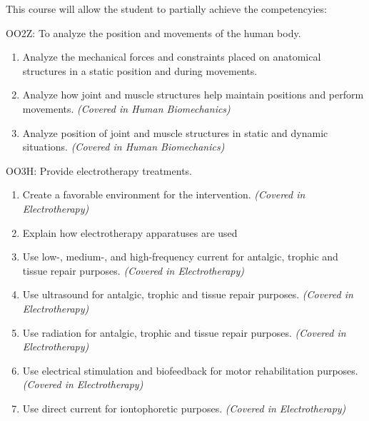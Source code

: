 {This course will allow the student to partially achieve the competencyies:

OO2Z:  To analyze the position and movements of the human body.
\begin{enumerate}
\item Analyze the mechanical forces and constraints placed on anatomical structures in a static position and during movements.
\item Analyze how joint and muscle structures help maintain positions and perform movements.  {\itshape (Covered in Human Biomechanics)}
\item Analyze position of joint and muscle structures in static and dynamic situations.  {\itshape (Covered in Human Biomechanics)}
\end{enumerate}
\smallskip

OO3H:	Provide electrotherapy treatments.
\begin{enumerate}
\item Create a favorable environment for the intervention.  {\itshape(Covered in Electrotherapy)}
\item Explain how electrotherapy apparatuses are used
\item Use low-, medium-, and high-frequency current for antalgic, trophic and tissue repair purposes.   {\itshape(Covered in Electrotherapy)}
\item Use ultrasound for antalgic, trophic and tissue repair purposes.  {\itshape(Covered in Electrotherapy)}
\item Use radiation for antalgic, trophic and tissue repair purposes. {\itshape (Covered in Electrotherapy)}
\item Use electrical stimulation and biofeedback for motor rehabilitation purposes.  {\itshape(Covered in Electrotherapy)}
\item Use direct current for iontophoretic purposes.  {\itshape(Covered in Electrotherapy)}
\end{enumerate}
}
